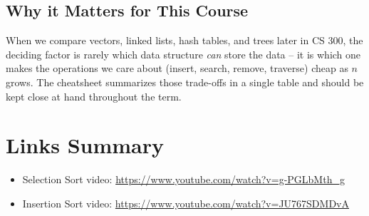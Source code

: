 \documentclass[11pt]{article}
\begin{document}
\subsection*{Why it Matters for This Course}
When we compare vectors, linked lists, hash tables, and trees later in CS 300,
the deciding factor is rarely which data structure \emph{can} store the data
-- it is which one makes the operations we care about (insert, search, remove,
traverse) cheap as $n$ grows. The cheatsheet summarizes those trade-offs in a
single table and should be kept close at hand throughout the term.

\section*{Links Summary}
\begin{itemize}[leftmargin=*]
    \item Selection Sort video: \url{https://www.youtube.com/watch?v=g-PGLbMth_g}
    \item Insertion Sort video: \url{https://www.youtube.com/watch?v=JU767SDMDvA}
\end{itemize}
\end{document}
